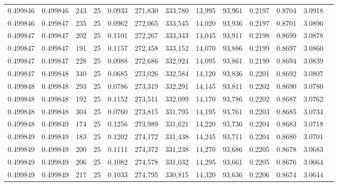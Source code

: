 \begin{tabular}{rrrrrrrrrrrrr}
0.499846 & 0.499846 &   243 &  25 &                                     0.0933 & 271,830 & 333,780 &  13,995 &  93,961 & 0.2197 & 0.8704 & 3.0918 \\
0.499846 & 0.499847 &   235 &  25 &                                     0.0962 & 272,065 & 333,545 &  14,020 &  93,936 & 0.2197 & 0.8701 & 3.0896 \\
0.499847 & 0.499847 &   202 &  25 &                                     0.1101 & 272,267 & 333,343 &  14,045 &  93,911 & 0.2198 & 0.8699 & 3.0878 \\
0.499847 & 0.499847 &   191 &  25 &                                     0.1157 & 272,458 & 333,152 &  14,070 &  93,886 & 0.2199 & 0.8697 & 3.0860 \\
0.499847 & 0.499847 &   228 &  25 &                                     0.0988 & 272,686 & 332,924 &  14,095 &  93,861 & 0.2199 & 0.8694 & 3.0839 \\
0.499847 & 0.499848 &   340 &  25 &                                     0.0685 & 273,026 & 332,584 &  14,120 &  93,836 & 0.2201 & 0.8692 & 3.0807 \\
0.499848 & 0.499848 &   293 &  25 &                                     0.0786 & 273,319 & 332,291 &  14,145 &  93,811 & 0.2202 & 0.8690 & 3.0780 \\
0.499848 & 0.499848 &   192 &  25 &                                     0.1152 & 273,511 & 332,099 &  14,170 &  93,786 & 0.2202 & 0.8687 & 3.0762 \\
0.499848 & 0.499848 &   304 &  25 &                                     0.0760 & 273,815 & 331,795 &  14,195 &  93,761 & 0.2203 & 0.8685 & 3.0734 \\
0.499848 & 0.499849 &   174 &  25 &                                     0.1256 & 273,989 & 331,621 &  14,220 &  93,736 & 0.2204 & 0.8683 & 3.0718 \\
0.499849 & 0.499849 &   183 &  25 &                                     0.1202 & 274,172 & 331,438 &  14,245 &  93,711 & 0.2204 & 0.8680 & 3.0701 \\
0.499849 & 0.499849 &   200 &  25 &                                     0.1111 & 274,372 & 331,238 &  14,270 &  93,686 & 0.2205 & 0.8678 & 3.0683 \\
0.499849 & 0.499849 &   206 &  25 &                                     0.1082 & 274,578 & 331,032 &  14,295 &  93,661 & 0.2205 & 0.8676 & 3.0664 \\
0.499849 & 0.499849 &   217 &  25 &                                     0.1033 & 274,795 & 330,815 &  14,320 &  93,636 & 0.2206 & 0.8674 & 3.0644 \\

\end{tabular}

